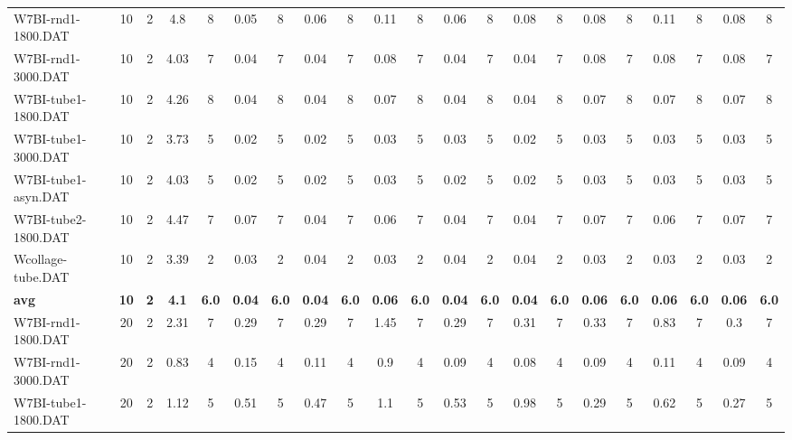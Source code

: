 \begin{sidewaystable}[!ht]
{\begin{tabular}{lcccccccccccccccccccc}
W7BI-rnd1-1800.DAT & 10 & 2 & 4.8 & 8 &  \textcolor{blue2}{0.05} & 8 & 0.06 & 8 & 0.11 & 8 & 0.06 & 8 & 0.08 & 8 & 0.08 & 8 & 0.11 & 8 & 0.08 & 8 \\
W7BI-rnd1-3000.DAT & 10 & 2 & 4.03 & 7 &  \textcolor{blue2}{0.04} & 7 &  \textcolor{blue2}{0.04} & 7 & 0.08 & 7 &  \textcolor{blue2}{0.04} & 7 &  \textcolor{blue2}{0.04} & 7 & 0.08 & 7 & 0.08 & 7 & 0.08 & 7 \\
W7BI-tube1-1800.DAT & 10 & 2 & 4.26 & 8 &  \textcolor{blue2}{0.04} & 8 &  \textcolor{blue2}{0.04} & 8 & 0.07 & 8 &  \textcolor{blue2}{0.04} & 8 &  \textcolor{blue2}{0.04} & 8 & 0.07 & 8 & 0.07 & 8 & 0.07 & 8 \\
W7BI-tube1-3000.DAT & 10 & 2 & 3.73 & 5 &  \textcolor{blue2}{0.02} & 5 &  \textcolor{blue2}{0.02} & 5 & 0.03 & 5 & 0.03 & 5 &  \textcolor{blue2}{0.02} & 5 & 0.03 & 5 & 0.03 & 5 & 0.03 & 5 \\
W7BI-tube1-asyn.DAT & 10 & 2 & 4.03 & 5 &  \textcolor{blue2}{0.02} & 5 &  \textcolor{blue2}{0.02} & 5 & 0.03 & 5 &  \textcolor{blue2}{0.02} & 5 &  \textcolor{blue2}{0.02} & 5 & 0.03 & 5 & 0.03 & 5 & 0.03 & 5 \\
W7BI-tube2-1800.DAT & 10 & 2 & 4.47 & 7 & 0.07 & 7 &  \textcolor{blue2}{0.04} & 7 & 0.06 & 7 &  \textcolor{blue2}{0.04} & 7 &  \textcolor{blue2}{0.04} & 7 & 0.07 & 7 & 0.06 & 7 & 0.07 & 7 \\
Wcollage-tube.DAT & 10 & 2 & 3.39 & 2 &  \textcolor{blue2}{0.03} & 2 & 0.04 & 2 &  \textcolor{blue2}{0.03} & 2 & 0.04 & 2 & 0.04 & 2 &  \textcolor{blue2}{0.03} & 2 &  \textcolor{blue2}{0.03} & 2 &  \textcolor{blue2}{0.03} & 2 \\
\cline{1-21} \textbf{avg} & \textbf{10} & \textbf{2} & \textbf{4.1} & \textbf{6.0} & \textbf{0.04} & \textbf{6.0} & \textbf{0.04} & \textbf{6.0} & \textbf{0.06} & \textbf{6.0} & \textbf{0.04} & \textbf{6.0} & \textbf{0.04} & \textbf{6.0} & \textbf{0.06} & \textbf{6.0} & \textbf{0.06} & \textbf{6.0} & \textbf{0.06} & \textbf{6.0} \\ \cline{1-21}
W7BI-rnd1-1800.DAT & 20 & 2 & 2.31 & 7 &  \textcolor{blue2}{0.29} & 7 &  \textcolor{blue2}{0.29} & 7 & 1.45 & 7 &  \textcolor{blue2}{0.29} & 7 & 0.31 & 7 & 0.33 & 7 & 0.83 & 7 & 0.3 & 7 \\
W7BI-rnd1-3000.DAT & 20 & 2 & 0.83 & 4 & 0.15 & 4 & 0.11 & 4 & 0.9 & 4 & 0.09 & 4 &  \textcolor{blue2}{0.08} & 4 & 0.09 & 4 & 0.11 & 4 & 0.09 & 4 \\
W7BI-tube1-1800.DAT & 20 & 2 & 1.12 & 5 & 0.51 & 5 & 0.47 & 5 & 1.1 & 5 & 0.53 & 5 & 0.98 & 5 & 0.29 & 5 & 0.62 & 5 &  \textcolor{blue2}{0.27} & 5 \\

\end{tabular}}
\end{sidewaystable}
